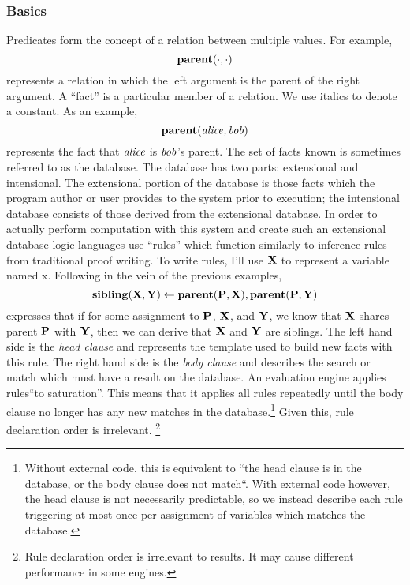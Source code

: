 \subsubsection{Basics}
Predicates form the concept of a relation between multiple values.
For example,
\[
        {\bf parent}(\cdot, \cdot)
\]
represents a relation in which the left argument is the parent of the right argument.
A ``fact'' is a particular member of a relation.
We use italics to denote a constant.
As an example,
\[
        {\bf parent}({\it alice}, {\it bob})
\]
represents the fact that ${\it alice}$ is ${\it bob}$'s parent.
The set of facts known is sometimes referred to as the database.
The database has two parts: extensional and intensional.
The extensional portion of the database is those facts which the program author or user provides to the system prior to execution; the intensional database consists of those derived from the extensional database.
In order to actually perform computation with this system and create such an extensional database logic languages use ``rules'' which function similarly to inference rules from traditional proof writing.
To write rules, I'll use ${\bf X}$ to represent a variable named x.
Following in the vein of the previous examples,
\[
        {\bf sibling}({\bf X}, {\bf Y}) \leftarrow {\bf parent}({\bf P}, {\bf X}), {\bf parent}({\bf P}, {\bf Y})
\]
expresses that if for some assignment to ${\bf P}$, ${\bf X}$, and ${\bf Y}$, we know that ${\bf X}$ shares parent ${\bf P}$ with ${\bf Y}$, then we can derive that ${\bf X}$ and ${\bf Y}$ are siblings.
The left hand side is the \emph{head clause} and represents the template used to build new facts with this rule.
The right hand side is the \emph{body clause} and describes the search or match which must have a result on the database.
An evaluation engine applies rules``to saturation''.
This means that it applies all rules repeatedly until the body clause no longer has any new matches in the database.\footnote {
Without external code, this is equivalent to ``the head clause is in the database, or the body clause does not match``. With external code however, the head clause is not necessarily predictable, so we instead describe each rule triggering at most once per assignment of variables which matches the database.
}
Given this, rule declaration order is irrelevant.
\footnote{
  Rule declaration order is irrelevant to results.
  It may cause different performance in some engines.
}
